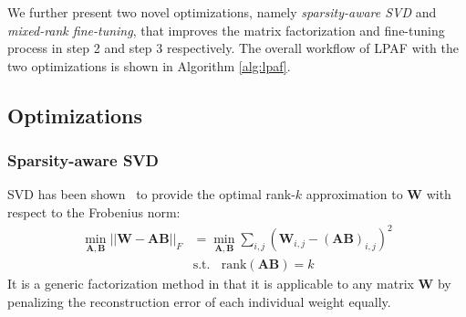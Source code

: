 We further present two novel optimizations, namely \textit{sparsity-aware SVD} and \textit{mixed-rank fine-tuning}, that improves the matrix factorization and fine-tuning process in step 2 and step 3 respectively. The overall workflow of LPAF with the two optimizations is shown in Algorithm \ref{alg:lpaf}.

\subsection{Optimizations}
\subsubsection{Sparsity-aware SVD}
\label{sec:sasvd}
SVD has been shown~\cite{bestsvd} to provide the optimal rank-$k$ approximation to $\bm{W}$ with respect to the Frobenius norm:
\begin{align}
	\nonumber
	\min_{\bm{A},\bm{B}} ||\bm{W}-\bm{A}\bm{B}||_{F}&=\min_{\bm{A},\bm{B}} \sum_{i,j}(\bm{W}_{i,j}-(\bm{AB})_{i,j})^2 \\
	& \text{s.t.}~~~~\text{rank}(\bm{AB})=k
\end{align}
It is a generic factorization method in that it is applicable to any matrix $\bm{W}$ by penalizing the reconstruction error of each individual weight equally. 

